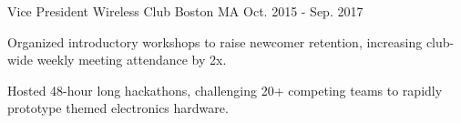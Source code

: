 

\begin{cventries}

  \cventry
    {Vice President} %
    {Wireless Club} %
    {Boston MA} %
    {Oct. 2015 - Sep. 2017} %
    {
      \begin{cvitems} %
        \item {Organized introductory workshops to raise newcomer retention, increasing club-wide weekly meeting attendance by 2x.}
        \item {Hosted 48-hour long hackathons, challenging 20+ competing teams to rapidly prototype themed electronics hardware.}
      \end{cvitems}
    }


\end{cventries}
